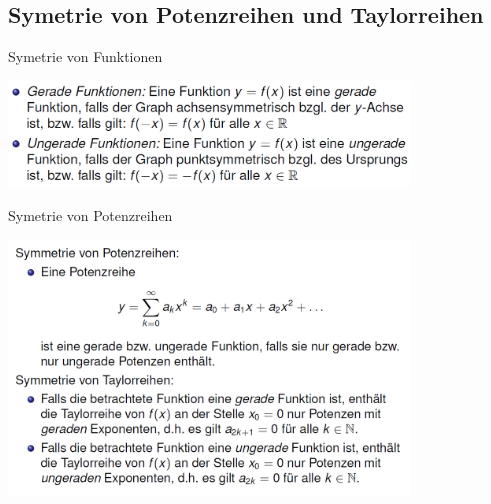 \subsection{Symetrie von Potenzreihen und Taylorreihen}
\begin{lemma}{Symetrie von Funktionen}\\
  \begin{centering}
    \includegraphics[width=0.8\textwidth]{images/2024-06-02-19-25-55.png}\\
  \end{centering}
\end{lemma}
\begin{lemma}{Symetrie von Potenzreihen}\\
  \begin{centering}
  \includegraphics[width=0.8\textwidth]{images/2024-06-02-19-28-18.png}\\
  \end{centering}
\end{lemma}
